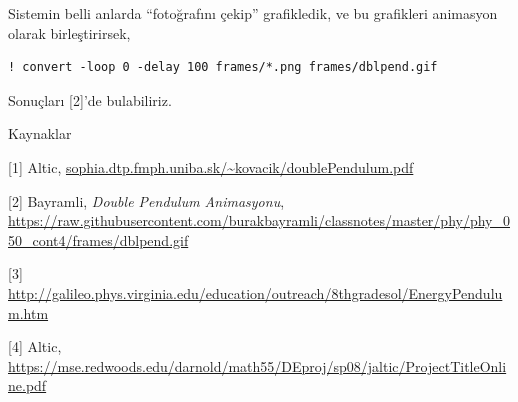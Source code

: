 \documentclass[12pt,fleqn]{article}\usepackage{../../common}
\begin{document}
Sistemin belli anlarda ``fotoğrafını çekip'' grafikledik, ve bu grafikleri
animasyon olarak birleştirirsek,

\begin{verbatim}
! convert -loop 0 -delay 100 frames/*.png frames/dblpend.gif
\end{verbatim}

Sonuçları [2]'de bulabiliriz. 

Kaynaklar

[1] Altic, \url{sophia.dtp.fmph.uniba.sk/~kovacik/doublePendulum.pdf}

[2] Bayramli, {\em Double Pendulum Animasyonu}, \url{https://raw.githubusercontent.com/burakbayramli/classnotes/master/phy/phy_050_cont4/frames/dblpend.gif}

[3] \url{http://galileo.phys.virginia.edu/education/outreach/8thgradesol/EnergyPendulum.htm}

[4] Altic, \url{https://mse.redwoods.edu/darnold/math55/DEproj/sp08/jaltic/ProjectTitleOnline.pdf}
\end{document}
